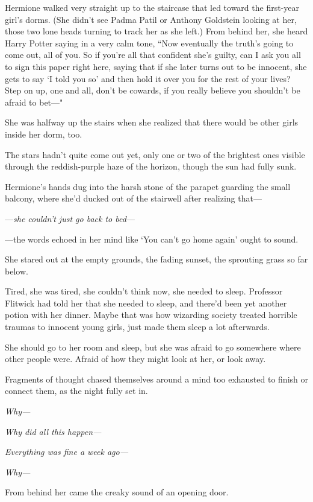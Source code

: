 Hermione walked very straight up to the staircase that led toward the first-year girl's dorms. (She didn't see Padma Patil or Anthony Goldstein looking at her, those two lone heads turning to track her as she left.) From behind her, she heard Harry Potter saying in a very calm tone, ``Now eventually the truth's going to come out, all of you. So if you're all that confident she's guilty, can I ask you all to sign this paper right here, saying that if she later turns out to be innocent, she gets to say `I told you so' and then hold it over you for the rest of your lives? Step on up, one and all, don't be cowards, if you really believe you shouldn't be afraid to bet—"

She was halfway up the stairs when she realized that there would be other girls inside her dorm, too.

\later

The stars hadn't quite come out yet, only one or two of the brightest ones visible through the reddish-purple haze of the horizon, though the sun had fully sunk.

Hermione's hands dug into the harsh stone of the parapet guarding the small balcony, where she'd ducked out of the stairwell after realizing that—

—\emph{she couldn't just go back to bed}—

—the words echoed in her mind like `You can't go home again' ought to sound.

She stared out at the empty grounds, the fading sunset, the sprouting grass so far below.

Tired, she was tired, she couldn't think now, she needed to sleep. Professor Flitwick had told her that she needed to sleep, and there'd been yet another potion with her dinner. Maybe that was how wizarding society treated horrible traumas to innocent young girls, just made them sleep a lot afterwards.

She should go to her room and sleep, but she was afraid to go somewhere where other people were. Afraid of how they might look at her, or look away.

Fragments of thought chased themselves around a mind too exhausted to finish or connect them, as the night fully set in.

\emph{Why—}

\emph{Why did all this happen—}

\emph{Everything was fine a week ago—}

\emph{Why—}

From behind her came the creaky sound of an opening door.

